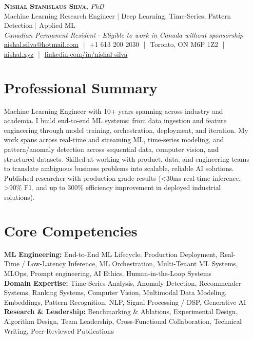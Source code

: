 \documentclass[11pt]{article}
\begin{document}
\pagestyle{empty}
\begin{center}
    {\LARGE \scshape \textbf{Nishal Stanislaus Silva}}{\large \textit{, PhD}}
    \\[1pt]
    {\small Machine Learning Research Engineer | Deep Learning, Time-Series, Pattern Detection | Applied ML}
    \\[1pt]
    {\footnotesize\textit{Canadian Permanent Resident $\cdot$ Eligible to work in Canada without sponsorship}}
    \\[1pt]
    {\small \href{mailto:nishal.silva@hotmail.com}{nishal.silva@hotmail.com}
    \,\,|\,\, +1 613 200 2030
    \,\,|\,\, Toronto, ON M6P 1Z2
    \,\,|\,\, \href{https://nishal.xyz}{nishal.xyz}
    \,\,|\,\, \href{https://www.linkedin.com/in/nishal-silva}{linkedin.com/in/nishal-silva}}
\end{center}

\section*{Professional Summary}
Machine Learning Engineer with 10+ years spanning across industry and academia. I build end-to-end ML systems: from data ingestion and feature engineering through model training, orchestration, deployment, and iteration. My work spans across real-time and streaming ML, time-series modeling, and pattern/anomaly detection across sequential data, computer vision, and structured datasets. Skilled at working with product, data, and engineering teams to translate ambiguous business problems into scalable, reliable AI solutions. Published researcher with production-grade results (<30ms real-time inference, >90\% F1, and up to 300\% efficiency improvement in deployed industrial solutions).

\section*{Core Competencies}
\textbf{ML Engineering:} End-to-End ML Lifecycle, Production Deployment, Real-Time / Low-Latency Inference, ML Orchestration, Multi-Tenant ML Systems, MLOps, Prompt engineering, AI Ethics, Human-in-the-Loop Systems\\
\textbf{Domain Expertise:} Time-Series Analysis, Anomaly Detection, Recommender Systems, Ranking Systems, Computer Vision, Multimodal Data Modeling, Embeddings, Pattern Recognition, NLP, Signal Processing / DSP, Generative AI\\
\textbf{Research \& Leadership:} Benchmarking \& Ablations, Experimental Design, Algorithm Design, Team Leadership, Cross-Functional Collaboration, Technical Writing, Peer-Reviewed Publications
\end{document}
